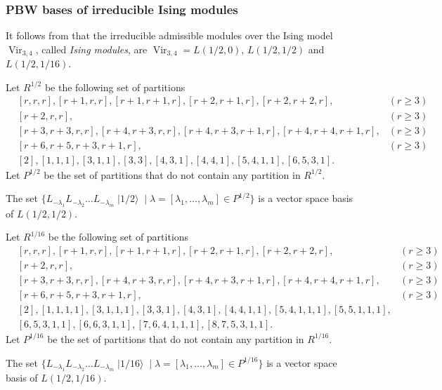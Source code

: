 \documentclass{beamer}
\DeclareMathOperator{\Vir}{Vir}
\DeclareMathOperator{\vachalf}{|1/2\rangle}
\DeclareMathOperator{\vacsixteen}{|1/16\rangle}
\begin{document}
\begin{frame}
  \frametitle{PBW bases of irreducible Ising modules}

  It follows from  that the irreducible admissible modules over the Ising model $\Vir_{3, 4}$, called \emph{Ising modules}, are $\Vir_{3, 4} = L(1/2, 0)$, $L(1/2, 1/2)$ and $L(1/2, 1/16)$.

  Let $R^{1/2}$ be the following set of partitions
  \footnotesize
  \begin{align*}
    &[r, r, r], [r + 1, r, r], [r + 1, r + 1, r], [r + 2, r + 1, r], [r + 2, r + 2, r], &(r \ge 3) \\
    &[r + 2, r, r], &(r \ge 3) \\
    &[r + 3, r + 3, r, r], [r + 4, r + 3, r, r],  [r + 4, r + 3, r + 1, r], [r + 4, r + 4, r + 1, r], &(r \ge 3)\\
    &[r + 6, r + 5, r + 3, r + 1, r], &(r \ge 3) \\
    &[2], [1, 1, 1], [3, 1, 1], [3, 3], [4, 3, 1], [4, 4, 1], [5, 4, 1, 1], [6, 5, 3, 1].
  \end{align*}
  \normalsize
  Let $P^{1/2}$ be the set of partitions that do not contain any partition in $R^{1/2}$.

  \begin{theorem}
    \label{thr:9}
    The set $\{L_{-\lambda_1}L_{-\lambda_2}\dots L_{-\lambda_m}\vachalf \mid \lambda = [\lambda_1, \dots, \lambda_m] \in P^{1/2}\}$ is a vector space basis of $L(1/2, 1/2)$.
  \end{theorem}

\end{frame}

\begin{frame}

  Let $R^{1/16}$ be the following set of partitions
  \footnotesize
  \begin{align*}
    &[r, r, r], [r + 1, r, r], [r + 1, r + 1, r], [r + 2, r + 1, r], [r + 2, r + 2, r], &(r \ge 3) \\
    &[r + 2, r, r], &(r \ge 3) \\
    &[r + 3, r + 3, r, r], [r + 4, r + 3, r, r],  [r + 4, r + 3, r + 1, r], [r + 4, r + 4, r + 1, r], &(r \ge 3)\\
    &[r + 6, r + 5, r + 3, r + 1, r], &(r \ge 3) \\
    &[2], [1, 1, 1, 1], [3, 1, 1, 1], [3, 3, 1], [4, 3, 1], [4, 4, 1, 1], [5, 4, 1, 1, 1], [5, 5, 1, 1, 1], \\
    &[6, 5, 3, 1, 1], [6, 6, 3, 1, 1], [7, 6, 4, 1, 1, 1], [8, 7, 5, 3, 1, 1].
  \end{align*}
  \normalsize
  Let $P^{1/16}$ be the set of partitions that do not contain any partition in $R^{1/16}$.

  \begin{theorem}
    \label{thr:10}
    The set $\{L_{-\lambda_1}L_{-\lambda_2}\dots L_{-\lambda_m}\vacsixteen \mid \lambda = [\lambda_1, \dots, \lambda_m] \in P^{1/16}\}$ is a vector space basis of $L(1/2, 1/16)$.
  \end{theorem}

\end{frame}
\end{document}
